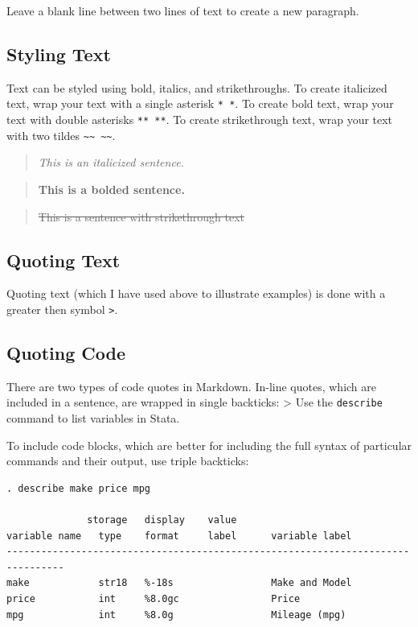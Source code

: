 \documentclass[]{book}
\theoremstyle{definition}
\theoremstyle{definition}
\theoremstyle{remark}
\begin{document}
Leave a blank line between two lines of text to create a new paragraph.

\subsection{Styling Text}\label{styling-text}

Text can be styled using bold, italics, and strikethroughs. To create
italicized text, wrap your text with a single asterisk \texttt{*\ *}. To
create bold text, wrap your text with double asterisks \texttt{**\ **}.
To create strikethrough text, wrap your text with two tildes
\texttt{\textasciitilde{}\textasciitilde{}\ \textasciitilde{}\textasciitilde{}}.

\begin{quote}
\emph{This is an italicized sentence.}
\end{quote}

\begin{quote}
\textbf{This is a bolded sentence.}
\end{quote}

\begin{quote}
\sout{This is a sentence with strikethrough text}
\end{quote}

\subsection{Quoting Text}\label{quoting-text}

Quoting text (which I have used above to illustrate examples) is done
with a greater then symbol \texttt{\textgreater{}}.

\subsection{Quoting Code}\label{quoting-code}

There are two types of code quotes in Markdown. In-line quotes, which
are included in a sentence, are wrapped in single backticks:
\textgreater{} Use the \texttt{describe} command to list variables in
Stata.

To include code blocks, which are better for including the full syntax
of particular commands and their output, use triple backticks:

\begin{verbatim}
. describe make price mpg

              storage   display    value
variable name   type    format     label      variable label
--------------------------------------------------------------------------------
make            str18   %-18s                 Make and Model
price           int     %8.0gc                Price
mpg             int     %8.0g                 Mileage (mpg)
\end{verbatim}
\end{document}
